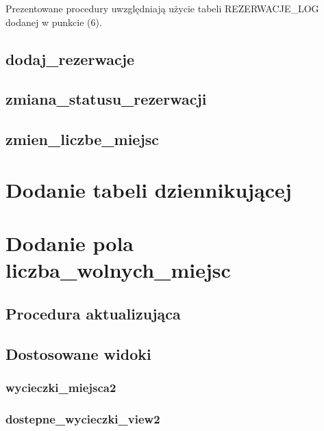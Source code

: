 \documentclass[12pt]{article}
\begin{document}
Prezentowane procedury uwzględniają użycie tabeli REZERWACJE\_LOG dodanej w punkcie (6).

\subsection{dodaj\_rezerwacje}


\subsection{zmiana\_statusu\_rezerwacji}


\subsection{zmien\_liczbe\_miejsc}


\section{Dodanie tabeli dziennikującej}



\section{Dodanie pola liczba_wolnych_miejsc}



\subsection{Procedura aktualizująca}


\subsection{Dostosowane widoki}

\subsubsection{wycieczki\_miejsca2}


\subsubsection{dostepne\_wycieczki\_view2}

\end{document}
